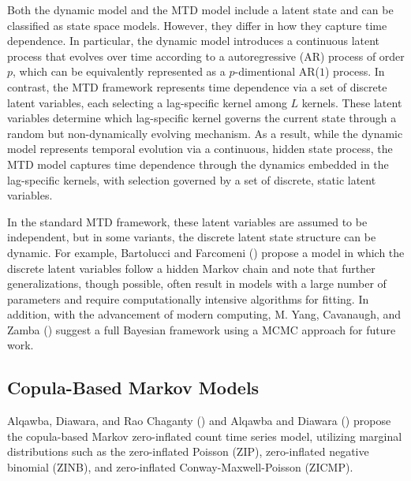 \documentclass[
  letterpaper,
  double,
  12pt,
  1.0in]{beavtex}
\begin{document}
Both the dynamic model and the MTD model include a latent state and can
be classified as state space models. However, they differ in how they
capture time dependence. In particular, the dynamic model introduces a
continuous latent process that evolves over time according to a
autoregressive (AR) process of order \(p\), which can be equivalently
represented as a \(p\)-dimentional AR(\(1\)) process. In contrast, the
MTD framework represents time dependence via a set of discrete latent
variables, each selecting a lag-specific kernel among \(L\) kernels.
These latent variables determine which lag-specific kernel governs the
current state through a random but non-dynamically evolving mechanism.
As a result, while the dynamic model represents temporal evolution via a
continuous, hidden state process, the MTD model captures time dependence
through the dynamics embedded in the lag-specific kernels, with
selection governed by a set of discrete, static latent variables.

In the standard MTD framework, these latent variables are assumed to be
independent, but in some variants, the discrete latent state structure
can be dynamic. For example, Bartolucci and Farcomeni
() propose a model in which the
discrete latent variables follow a hidden Markov chain and note that
further generalizations, though possible, often result in models with a
large number of parameters and require computationally intensive
algorithms for fitting. In addition, with the advancement of modern
computing, M. Yang, Cavanaugh, and Zamba
() suggest a full Bayesian
framework using a MCMC approach for future work.

\subsection{Copula-Based Markov
Models}\label{copula-based-markov-models}

Alqawba, Diawara, and Rao Chaganty
() and Alqawba and Diawara
() propose the copula-based Markov
zero-inflated count time series model, utilizing marginal distributions
such as the zero-inflated Poisson (ZIP), zero-inflated negative binomial
(ZINB), and zero-inflated Conway-Maxwell-Poisson (ZICMP).
\end{document}
